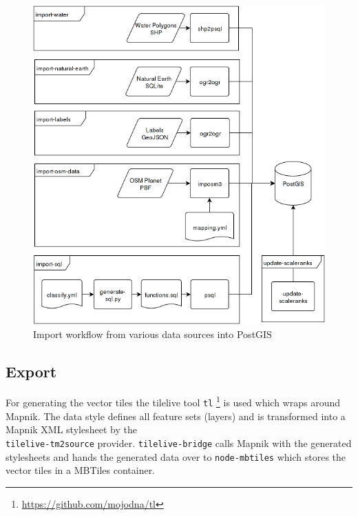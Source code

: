 \begin{figure}[H]
  \includegraphics[scale=0.6]{images/import_package_flow.png}
  \caption{Import workflow from various data sources into PostGIS}
\end{figure}

\newpage
\subsection{Export}\label{workflow-export}

For generating the vector tiles the tilelive tool \texttt{tl} \footnote{\url{https://github.com/mojodna/tl}} is used which wraps
around Mapnik. 
The data style defines all feature sets (layers) and is transformed into a Mapnik XML stylesheet by the \\
\texttt{tilelive-tm2source} provider.
\texttt{tilelive-bridge} calls Mapnik with the generated stylesheets and hands the generated data over to \texttt{node-mbtiles} which stores the vector tiles in a MBTiles container.


